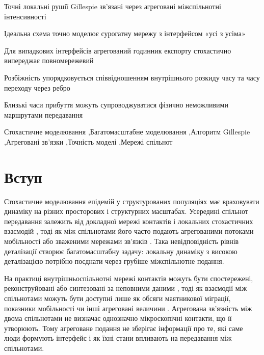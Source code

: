 \begin{highlights}
\item Точні локальні рушії Gillespie зв'язані через агреговані міжспільнотні інтенсивності
\item Ідеальна схема точно моделює сурогатну мережу з інтерфейсом «усі з усіма»
\item Для випадкових інтерфейсів агрегований годинник експорту стохастично випереджає повномережевий
\item Розбіжність упорядковується співвідношенням внутрішнього розкиду часу та часу переходу через ребро
\item Близькі часи прибуття можуть супроводжуватися фізично неможливими маршрутами передавання
\end{highlights}

\begin{keywords}
Стохастичне моделювання \sep Багатомасштабне моделювання \sep Алгоритм Gillespie \sep Агреговані зв'язки \sep Точність моделі \sep Мережі спільнот
\end{keywords}

\maketitle

\section{Вступ}
\label{sec:introduction}

Стохастичне моделювання епідемій у структурованих популяціях має враховувати динаміку на різних просторових і структурних масштабах. Усередині спільнот передавання залежить від докладної мережі контактів і локальних стохастичних взаємодій \citep{keeling2005,pastorsatorras2015,kiss2017}, тоді як між спільнотами його часто подають агрегованими потоками мобільності або зваженими мережами зв'язків \citep{balcan2009,barbosa2018human}. Така невідповідність рівнів деталізації створює багатомасштабну задачу: локальну динаміку з високою деталізацією потрібно поєднати через грубіше міжспільнотне подання.

На практиці внутрішньоспільнотні мережі контактів можуть бути спостережені, реконструйовані або синтезовані за неповними даними \citep{eubank2004,danon2011}, тоді як взаємодії між спільнотами можуть бути доступні лише як обсяги маятникової міграції, показники мобільності чи інші агреговані величини \citep{barbosa2018human,chang2021}. Агрегована зв'язність між двома спільнотами не визначає однозначно мікроскопічні контакти, що її утворюють. Тому агреговане подання не зберігає інформації про те, які саме люди формують інтерфейс і як їхні стани впливають на передавання між спільнотами.

